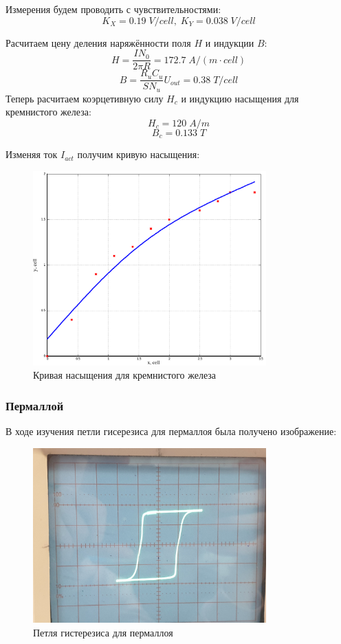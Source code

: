 \documentclass{article}
\begin{document}
Измерения будем проводить с чувствительностями:
\[ K_X = 0.19\; V/cell,\; K_Y = 0.038\; V/cell  \]

Расчитаем цену деления наряжённости поля $H$ и индукции $B$:
\[ H = \frac{IN_0}{2\pi R} = 172.7\; A/(m\cdot cell) \]
\[ B = \frac{R_uC_u}{SN_u}U_{out} = 0.38\; T/cell \]
Теперь расчитаем коэрцетивную силу $H_c$ и индукцию насыщения для кремнистого железа:
\[ H_c = 120\; A/m \]
\[ B_c = 0.133\; T \]

Изменяя ток $I_{act}$ получим кривую насыщения:
\begin{figure}[H]
    \centering
    \includegraphics[width = 0.8\textwidth]{1-d.png}
    \caption{Кривая насыщения для кремнистого железа}
\end{figure}

\subsubsection{Пермаллой}
В ходе изучения петли гисерезиса для пермаллоя была получено изображение:
\begin{figure}[H]
    \centering
    \includegraphics[width = 0.8\textwidth]{2-1.jpg}
    \caption{Петля гистерезиса для пермаллоя}
\end{figure}
\end{document}
